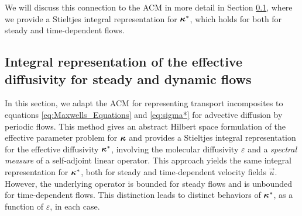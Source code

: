 \documentclass[11pt]{amsart}
\newcommand{\Hb}{\mathbf{H}}
\newcommand\bkappa{\mbox{\boldmath${\kappa}$}}
\begin{document}
%
We will discuss this connection to the ACM in more detail in Section
\ref{sec:Integral_Rep}, where we provide a Stieltjes integral
representation for $\bkappa^*$, which holds for both for steady and
time-dependent flows. 




\subsection{Integral representation of the effective diffusivity for
  steady and dynamic flows}\label{sec:Integral_Rep}
%
In this section, we adapt the ACM for representing transport
incomposites \cite{Golden:CMP-473} to equations
\eqref{eq:Maxwells_Equations} and \eqref{eq:sigma*} for advective
diffusion by periodic flows. This method gives an abstract Hilbert
space formulation of the effective parameter problem for $\bkappa$ and
provides a Stieltjes integral representation for the effective
diffusivity $\bkappa^*$, involving the molecular diffusivity $\varepsilon$ and a
\emph{spectral measure} of a self-adjoint linear operator. This
approach yields the same integral representation for $\bkappa^*$, both
for steady and time-dependent velocity fields $\vec{u}$. However, the
underlying operator is bounded for steady flows and is unbounded for 
time-dependent flows. This distinction leads to distinct behaviors of
$\bkappa^*$, as a function of $\varepsilon$, in each case. 
\end{document}
